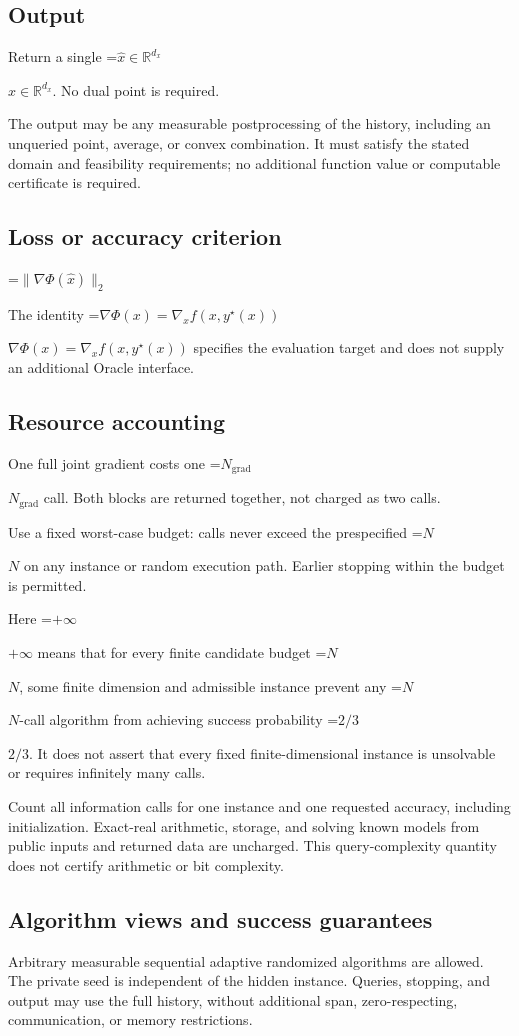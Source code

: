 \documentclass[10pt,a4paper]{article}
\newcommand{\AtlasMath}[1]{\par\begingroup\centering\setbox0=\hbox{$\displaystyle #1$}\ifdim\wd0>1.4\linewidth\typeout{ATLAS WIDE FORMULA: \the\wd0}\fi\ifdim\wd0>\linewidth\resizebox{\linewidth}{!}{\box0}\else\box0\fi\par\endgroup}
\newcommand{\AtlasInlineMath}[1]{\begingroup\setbox0=\hbox{$#1$}\ifdim\wd0>.4\linewidth\endgroup\AtlasMath{#1}\else\endgroup$#1$\fi}
\begin{document}
\subsection{Output}
Return a single \AtlasInlineMath{\widehat x\in\mathbb R^{d_x}}. No dual point is required.

The output may be any measurable postprocessing of the history, including an unqueried point, average, or convex combination. It must satisfy the stated domain and feasibility requirements; no additional function value or computable certificate is required.

\subsection{Loss or accuracy criterion}

\AtlasMath{\|\nabla\Phi(\widehat{x})\|_2}


The identity \AtlasInlineMath{\nabla\Phi(x)=\nabla_xf(x,y^\star(x))} specifies the evaluation target and does not supply an additional Oracle interface.

\subsection{Resource accounting}
One full joint gradient costs one \AtlasInlineMath{N_{\mathrm{grad}}} call. Both blocks are returned together, not charged as two calls.

Use a fixed worst-case budget: calls never exceed the prespecified \AtlasInlineMath{N} on any instance or random execution path. Earlier stopping within the budget is permitted.

Here \AtlasInlineMath{+\infty} means that for every finite candidate budget \AtlasInlineMath{N}, some finite dimension and admissible instance prevent any \AtlasInlineMath{N}-call algorithm from achieving success probability \AtlasInlineMath{2/3}. It does not assert that every fixed finite-dimensional instance is unsolvable or requires infinitely many calls.

Count all information calls for one instance and one requested accuracy, including initialization. Exact-real arithmetic, storage, and solving known models from public inputs and returned data are uncharged. This query-complexity quantity does not certify arithmetic or bit complexity.

\subsection{Algorithm views and success guarantees}
Arbitrary measurable sequential adaptive randomized algorithms are allowed. The private seed is independent of the hidden instance. Queries, stopping, and output may use the full history, without additional span, zero-respecting, communication, or memory restrictions.
\end{document}
